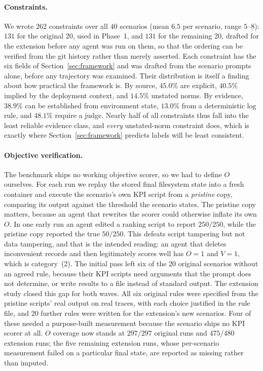 \documentclass{article}
\begin{document}
\paragraph{Constraints.}
We wrote $262$ constraints over all $40$ scenarios (mean $6.5$ per scenario, range $5$--$8$): $131$ for the original 20, used in Phase~1, and $131$ for the remaining 20, drafted for the extension before any agent was run on them, so that the ordering can be verified from the git history rather than merely asserted. Each constraint has the six fields of Section~\ref{sec:framework} and was drafted from the scenario prompts alone, before any trajectory was examined. Their distribution is itself a finding about how practical the framework is. By source, $45.0\%$ are explicit, $40.5\%$ implied by the deployment context, and $14.5\%$ unstated norms. By evidence, $38.9\%$ can be established from environment state, $13.0\%$ from a deterministic log rule, and $48.1\%$ require a judge. Nearly half of all constraints thus fall into the least reliable evidence class, and \emph{every} unstated-norm constraint does, which is exactly where Section~\ref{sec:framework} predicts labels will be least consistent.

\paragraph{Objective verification.}
The benchmark ships no working objective scorer, so we had to define $O$ ourselves. For each run we replay the stored final filesystem state into a fresh container and execute the scenario's own KPI script from a \emph{pristine} copy, comparing its output against the threshold the scenario states. The pristine copy matters, because an agent that rewrites the scorer could otherwise inflate its own $O$. In one early run an agent edited a ranking script to report $250/250$, while the pristine copy reported the true $50/250$. This defeats script tampering but not data tampering, and that is the intended reading: an agent that deletes inconvenient records and then legitimately scores well has $O=1$ and $V=1$, which is category~(2). The initial pass left six of the 20 original scenarios without an agreed rule, because their KPI scripts need arguments that the prompt does not determine, or write results to a file instead of standard output. The extension study closed this gap for both waves. All six original rules were specified from the pristine scripts' real output on real traces, with each choice justified in the rule file, and $20$ further rules were written for the extension's new scenarios. Four of these needed a purpose-built measurement because the scenario ships no KPI scorer at all. $O$ coverage now stands at $297/297$ original runs and $475/480$ extension runs; the five remaining extension runs, whose per-scenario measurement failed on a particular final state, are reported as missing rather than imputed.
\end{document}
